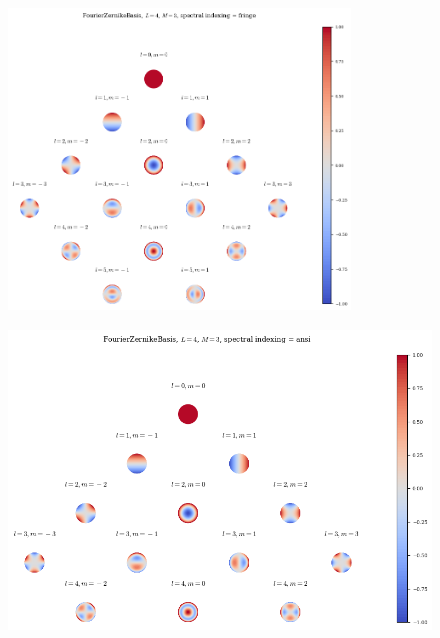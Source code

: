\begin{minipage}[c][6cm][c]{\textwidth}
    \begin{minipage}[t][6cm][t]{0.5\textwidth}
        \begin{figure}[H]
            \centering
         \includegraphics[width=\textwidth,height=8cm,keepaspectratio]{figures/fringeL4M3.png}
        \end{figure}
    \end{minipage}
    \begin{minipage}[t][6cm][t]{0.5\textwidth}
        \begin{figure}[H]
            \centering
            \includegraphics[width=\textwidth,height=8cm,keepaspectratio]{figures/ansiL4M3.png}
        \end{figure}
    \end{minipage}
\end{minipage}
